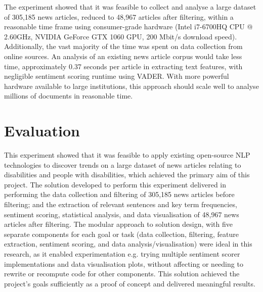 \documentclass{report}
\begin{document}
The experiment showed that it was feasible to collect and analyse a large dataset of 305,185 news articles, reduced to 48,967 articles after filtering, within a reasonable time frame using consumer-grade hardware (Intel i7-6700HQ CPU @ 2.60GHz, NVIDIA GeForce GTX 1060 GPU, 200 Mbit/s download speed).
Additionally, the vast majority of the time was spent on data collection from online sources.
An analysis of an existing news article corpus would take less time, approximately 0.37 seconds per article in extracting text features, with negligible sentiment scoring runtime using VADER.
With more powerful hardware available to large institutions, this approach should scale well to analyse millions of documents in reasonable time.

\section{Evaluation} \label{Evaluation}

This experiment showed that it was feasible to apply existing open-source NLP technologies to discover trends on a large dataset of news articles relating to disabilities and people with disabilities, which achieved the primary aim of this project.
The solution developed to perform this experiment delivered in performing the data collection and filtering of 305,185 news articles before filtering; 
and the extraction of relevant sentences and key term frequencies, sentiment scoring, statistical analysis, and data visualisation of 48,967 news articles after filtering.
The modular approach to solution design, with five separate components for each goal or task (data collection, filtering, feature extraction, sentiment scoring, and data analysis/visualisation) were ideal in this research, as it enabled experimentation e.g. trying multiple sentiment scorer implementations and data visualisation plots, without affecting or needing to rewrite or recompute code for other components.
This solution achieved the project's goals sufficiently as a proof of concept and delivered meaningful results.
\end{document}
